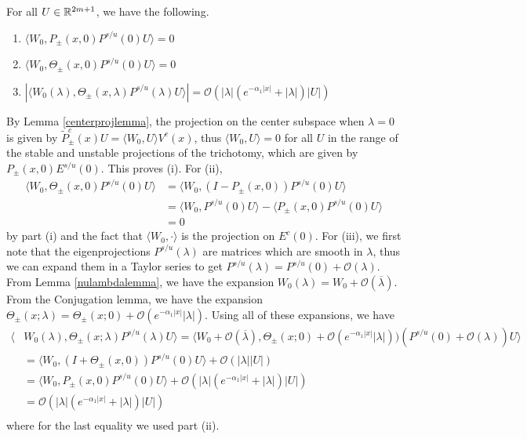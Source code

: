 \documentclass[thesis.tex]{subfiles}
\begin{document}
\begin{lemma}\label{W0projlemma}
For all $U \in \mathbb{R}^{2m+1}$, we have the following.
\begin{enumerate}
	\item $\langle W_0, P_\pm(x, 0) P^{s/u}(0) U \rangle = 0$
	\item $\langle W_0, \Theta_\pm(x, 0) P^{s/u}(0) U \rangle = 0$
	\item $|\langle W_0(\lambda), \Theta_\pm(x, \lambda) P^{s/u}(\lambda) U \rangle | = \mathcal{O}(|\lambda|( e^{-\alpha_1 |x|} + |\lambda|)|U|)$
\end{enumerate}
By Lemma \ref{centerprojlemma}, the projection on the center subspace when $\lambda = 0$ is given by $\tilde{P}_\pm^c(x)U = \langle W_0, U \rangle V^c(x)$, thus $\langle W_0, U \rangle = 0$ for all $U$ in the range of the stable and unstable projections of the trichotomy, which are given by $P_\pm(x, 0) E^{s/u}(0)$. This proves (i). For (ii), 
\begin{align*}
\langle W_0, \Theta_\pm(x, 0) P^{s/u}(0) U\rangle &=
\langle W_0, (I - P_\pm(x, 0)) P^{s/u}(0) U\rangle \\
&= \langle W_0, P^{s/u}(0) U \rangle - \langle P_\pm(x, 0)P^{s/u}(0) U \rangle \\
&= 0
\end{align*}
by part (i) and the fact that $\langle W_0, \cdot \rangle$ is the projection on $E^c(0)$. For (iii), we first note that the eigenprojections $P^{s/u}(\lambda)$ are matrices which are smooth in $\lambda$, thus we can expand them in a Taylor series to get $P^{s/u}(\lambda) = P^{s/u}(0) + \mathcal{O}(\lambda)$. From Lemma \ref{nulambdalemma}, we have the expansion $W_0(\lambda) = W_0 + \mathcal{O}(\overline{\lambda})$. From the Conjugation lemma, we have the expansion $\Theta_\pm(x; \lambda) = \Theta_\pm(x; 0) + \mathcal{O}(e^{-\alpha_1 |x|}|\lambda|)$. Using all of these expansions, we have
\begin{align*}
\langle &W_0(\lambda), \Theta_\pm(x; \lambda) P^{s/u}(\lambda) U \rangle = \langle W_0 + \mathcal{O}(\overline{\lambda}), \Theta_\pm(x; 0) + \mathcal{O}(e^{-\alpha_1 |x|}|\lambda|))(P^{s/u}(0) + \mathcal{O}(\lambda)) U \rangle \\
&= \langle W_0, (I + \Theta_\pm(x, 0))P^{s/u}(0)U \rangle +
\mathcal{O}(|\lambda||U|) \\
&= \langle W_0, P_\pm(x, 0)P^{s/u}(0)U \rangle +
\mathcal{O}(|\lambda|( e^{-\alpha_1 |x|} + |\lambda|)|U|)\\
&= \mathcal{O}(|\lambda|( e^{-\alpha_1 |x|} + |\lambda|)|U|) \\
\end{align*}
where for the last equality we used part (ii).
\end{lemma}
\end{document}
